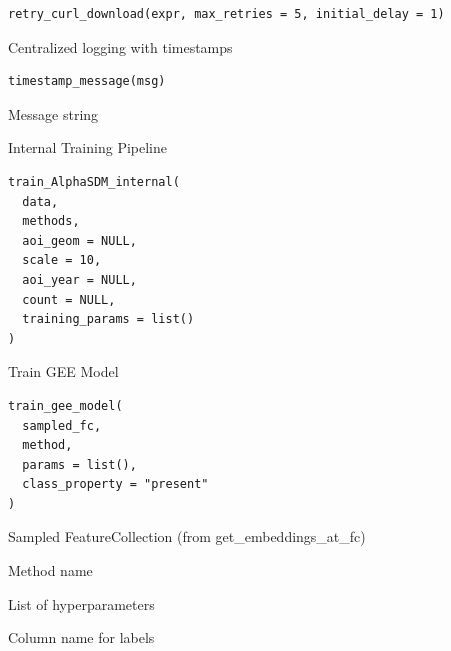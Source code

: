 \documentclass[letterpaper]{book}
\begin{document}
%
\begin{Usage}
\begin{verbatim}
retry_curl_download(expr, max_retries = 5, initial_delay = 1)
\end{verbatim}
\end{Usage}
%
\begin{Description}
Centralized logging with timestamps
\end{Description}
%
\begin{Usage}
\begin{verbatim}
timestamp_message(msg)
\end{verbatim}
\end{Usage}
%
\begin{Arguments}
\begin{ldescription}
\item[\code{msg}] Message string
\end{ldescription}
\end{Arguments}
%
\begin{Description}
Internal Training Pipeline
\end{Description}
%
\begin{Usage}
\begin{verbatim}
train_AlphaSDM_internal(
  data,
  methods,
  aoi_geom = NULL,
  scale = 10,
  aoi_year = NULL,
  count = NULL,
  training_params = list()
)
\end{verbatim}
\end{Usage}
%
\begin{Description}
Train GEE Model
\end{Description}
%
\begin{Usage}
\begin{verbatim}
train_gee_model(
  sampled_fc,
  method,
  params = list(),
  class_property = "present"
)
\end{verbatim}
\end{Usage}
%
\begin{Arguments}
\begin{ldescription}
\item[\code{sampled\_fc}] Sampled FeatureCollection (from get\_embeddings\_at\_fc)

\item[\code{method}] Method name

\item[\code{params}] List of hyperparameters

\item[\code{class\_property}] Column name for labels
\end{ldescription}
\end{Arguments}
\end{document}
